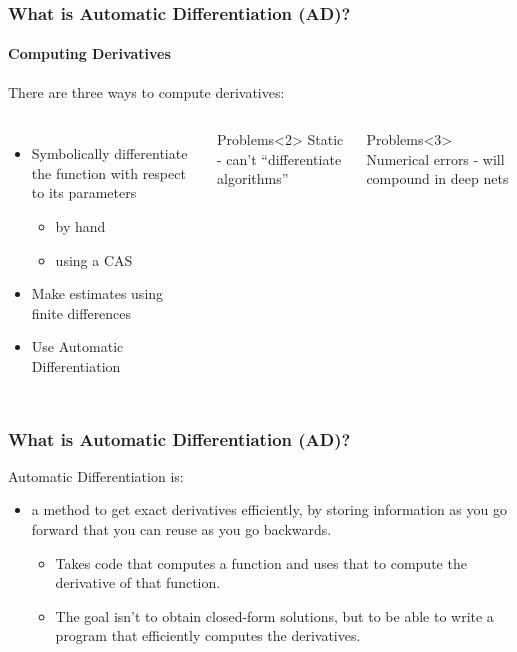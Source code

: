 \documentclass[\beamerclass]{beamer}
\begin{document}
\begin{frame}
	\frametitle{What is Automatic Differentiation (AD)?}
	\framesubtitle{Computing Derivatives}
There are three ways to compute derivatives:

\begin{columns}
    \begin{itemize}
    	\item<1,2> Symbolically differentiate the function with respect to its parameters
    	\begin{itemize}
    		\item by hand
    		\item using a CAS
    	\end{itemize}
    	\item<1,3> Make estimates using finite differences
    	\item<1,4> Use Automatic Differentiation
    \end{itemize}

      \begin{block}{Problems}<2>
        Static - can't ``differentiate algorithms''
      \end{block}
      \begin{block}{Problems}<3>
        Numerical errors - will compound in deep nets
      \end{block}
  \end{columns}
\end{frame}

\begin{frame}
	\frametitle{What is Automatic Differentiation (AD)?}

	Automatic Differentiation is:
	\begin{itemize}
		\item a method to get exact derivatives efficiently, by storing information as you go forward that you can reuse as you go backwards.
		\begin{itemize}
			\item Takes code that computes a function and uses that to compute the derivative of that function.
		\item The goal isn't to obtain closed-form solutions, but to be able to write a program that efficiently computes the derivatives.
		\end{itemize}
	\end{itemize}
\end{frame}
\end{document}
